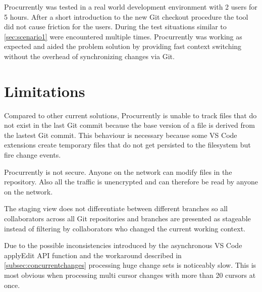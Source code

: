 Procurrently was tested in a real world development environment with 2 users for 5 hours. After a short introduction to the new Git checkout procedure the tool did not cause friction for the users. During the test situations similar to \ref{sec:scenario1} were encountered multiple times. Procurrently was working as expected and aided the problem solution by providing fast context switching without the overhead of synchronizing changes via Git.

\section{Limitations}

Compared to other current solutions, Procurrently is unable to track files that do not exist in the last Git commit because the base version of a file is derived from the lastest Git commit. This behaviour is necessary because some VS Code extensions create temporary files that do not get persisted to the filesystem but fire change events.

Procurrently is not secure. Anyone on the network can modify files in the repository. Also all the traffic is unencrypted and can therefore be read by anyone on the network.

The staging view does not differentiate between different branches so all collaborators across all Git repositories and branches are presented as stageable instead of filtering by collaborators who changed the current working context.

Due to the possible inconsistencies introduced by the asynchronous VS Code applyEdit API function and the workaround described in \ref{subsec:concurrentchanges} processing huge change sets is noticeably slow. This is most obvious when processing multi cursor changes with more than 20 cursors at once.